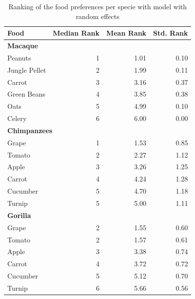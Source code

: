 \documentclass[
]{book}
\begin{document}
\begin{table}

\caption{\label{tab:unnamed-chunk-65}Ranking of the food preferences per specie with model with random effects}
\centering
\begin{tabular}[t]{l|r|r|r}
\hline
Food & Median Rank & Mean Rank & Std. Rank\\
\hline
\multicolumn{4}{l}{\textbf{Macaque}}\\
\hline
\hspace{1em}Peanuts & 1 & 1.01 & 0.10\\
\hline
\hspace{1em}Jungle Pellet & 2 & 1.99 & 0.11\\
\hline
\hspace{1em}Carrot & 3 & 3.16 & 0.37\\
\hline
\hspace{1em}Green Beans & 4 & 3.85 & 0.38\\
\hline
\hspace{1em}Oats & 5 & 4.99 & 0.10\\
\hline
\hspace{1em}Celery & 6 & 6.00 & 0.00\\
\hline
\multicolumn{4}{l}{\textbf{Chimpanzees}}\\
\hline
\hspace{1em}Grape & 1 & 1.53 & 0.85\\
\hline
\hspace{1em}Tomato & 2 & 2.27 & 1.12\\
\hline
\hspace{1em}Apple & 3 & 3.26 & 1.25\\
\hline
\hspace{1em}Carrot & 4 & 4.24 & 1.28\\
\hline
\hspace{1em}Cucumber & 5 & 4.70 & 1.18\\
\hline
\hspace{1em}Turnip & 5 & 5.00 & 1.11\\
\hline
\multicolumn{4}{l}{\textbf{Gorilla}}\\
\hline
\hspace{1em}Grape & 2 & 1.55 & 0.60\\
\hline
\hspace{1em}Tomato & 2 & 1.57 & 0.61\\
\hline
\hspace{1em}Apple & 3 & 3.38 & 0.74\\
\hline
\hspace{1em}Carrot & 4 & 3.72 & 0.72\\
\hline
\hspace{1em}Cucumber & 5 & 5.12 & 0.70\\
\hline
\hspace{1em}Turnip & 6 & 5.66 & 0.56\\
\hline
\end{tabular}
\end{table}
\end{document}
